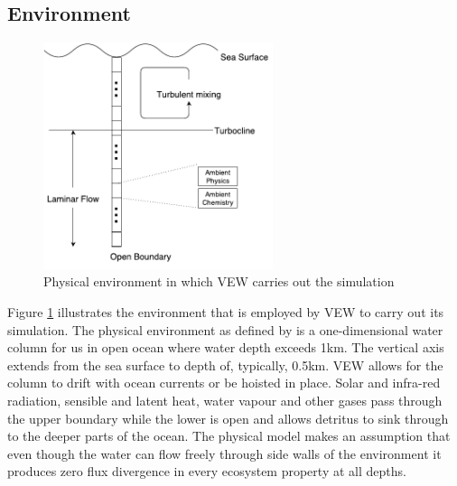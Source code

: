 \documentclass[12pt, a4paper]{report}
\begin{document}
\subsection{Environment}\label{para:1d-phys}
\begin{figure}[H]
  \begin{center}
    \includegraphics[width=0.6\textwidth,natwidth=473,natheight=466]{images/env-diagram.pdf}
    \caption{Physical environment in which VEW carries out the simulation}
    \label{fig:env}
  \end{center}
\end{figure}

Figure \ref{fig:env} illustrates the environment that is employed by VEW
to carry out its simulation. The physical environment as defined by \cite{Woods2005}
is a one-dimensional water column for us in open ocean where water depth exceeds 1km.
The vertical axis extends from the sea surface to depth of, typically, 0.5km.
VEW allows for the column to drift with ocean currents or be hoisted in place.
Solar and infra-red radiation, sensible and latent heat, water vapour
and other gases pass through the upper boundary while the lower is open
and allows detritus to sink through to the deeper parts of the ocean.
The physical model makes an assumption that even though the
water can flow freely through side walls of the environment it produces
zero flux divergence in every ecosystem property at all depths.
\end{document}
